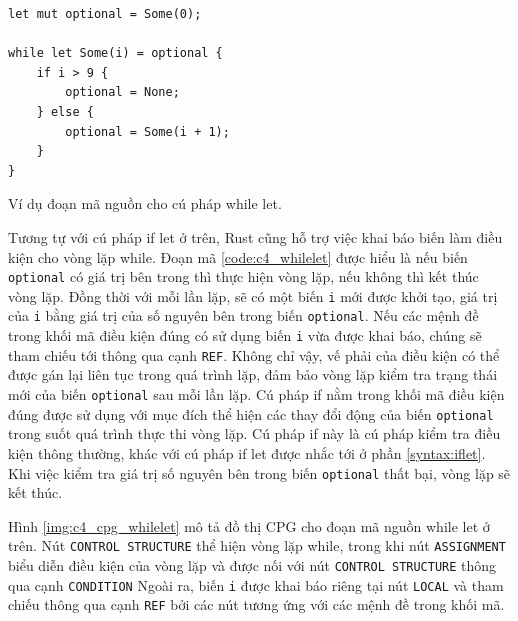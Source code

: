 \begin{listing}[H]
\begin{verbatim}
let mut optional = Some(0);

while let Some(i) = optional {
    if i > 9 {
        optional = None;
    } else {
        optional = Some(i + 1);
    }
}
\end{verbatim}
\caption{Ví dụ đoạn mã nguồn cho cú pháp while let.}
\label{code:c4_whilelet}
\end{listing}

Tương tự với cú pháp if let ở trên, Rust cũng hỗ trợ việc khai báo biến làm điều kiện cho vòng lặp while.
Đoạn mã \ref{code:c4_whilelet} được hiểu là nếu biến \texttt{optional} có giá trị bên trong thì thực hiện vòng lặp, nếu không thì kết thúc vòng lặp.
Đồng thời với mỗi lần lặp, sẽ có một biến \texttt{i} mới được khởi tạo, giá trị của \texttt{i} bằng giá trị của số nguyên bên trong biến \texttt{optional}.
Nếu các mệnh đề trong khối mã điều kiện đúng có sử dụng biến \texttt{i} vừa được khai báo, chúng sẽ tham chiếu tới thông qua cạnh \texttt{REF}.
Không chỉ vậy, vế phải của điều kiện có thể được gán lại liên tục trong quá trình lặp, đảm bảo vòng lặp kiểm tra trạng thái mới của biến \texttt{optional} sau mỗi lần lặp.
Cú pháp if nằm trong khối mã điều kiện đúng được sử dụng với mục đích thể hiện các thay đổi động của biến \texttt{optional} trong suốt quá trình thực thi vòng lặp.
Cú pháp if này là cú pháp kiểm tra điều kiện thông thường, khác với cú pháp if let được nhắc tới ở phần \ref{syntax:iflet}.
Khi việc kiểm tra giá trị số nguyên bên trong biến \texttt{optional} thất bại, vòng lặp sẽ kết thúc.

Hình \ref{img:c4_cpg_whilelet} mô tả đồ thị CPG cho đoạn mã nguồn while let ở trên.
Nút \texttt{CONTROL STRUCTURE} thể hiện vòng lặp while, trong khi nút \texttt{ASSIGNMENT} biểu diễn điều kiện của vòng lặp và được nối với nút \texttt{CONTROL STRUCTURE} thông qua cạnh \texttt{CONDITION}
Ngoài ra, biến \texttt{i} được khai báo riêng tại nút \texttt{LOCAL} và tham chiếu thông qua cạnh \texttt{REF} bởi các nút tương ứng với các mệnh đề trong khối mã.

